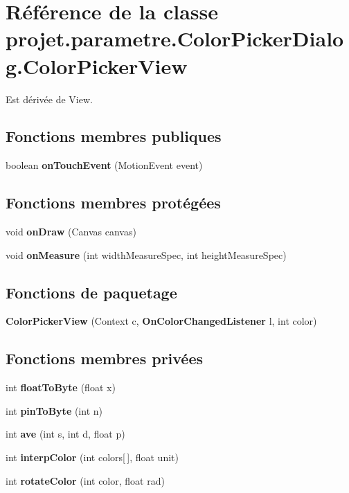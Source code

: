 \section{\-Référence de la classe projet.\-parametre.\-Color\-Picker\-Dialog.\-Color\-Picker\-View}
\label{classprojet_1_1parametre_1_1_color_picker_dialog_1_1_color_picker_view}


\-Est dérivée de \-View.

\subsection*{\-Fonctions membres publiques}
\begin{DoxyCompactItemize}
\item 
boolean {\bf on\-Touch\-Event} (\-Motion\-Event event)
\end{DoxyCompactItemize}
\subsection*{\-Fonctions membres protégées}
\begin{DoxyCompactItemize}
\item 
void {\bf on\-Draw} (\-Canvas canvas)
\item 
void {\bf on\-Measure} (int width\-Measure\-Spec, int height\-Measure\-Spec)
\end{DoxyCompactItemize}
\subsection*{\-Fonctions de paquetage}
\begin{DoxyCompactItemize}
\item 
{\bf \-Color\-Picker\-View} (\-Context c, {\bf \-On\-Color\-Changed\-Listener} l, int color)
\end{DoxyCompactItemize}
\subsection*{\-Fonctions membres privées}
\begin{DoxyCompactItemize}
\item 
int {\bf float\-To\-Byte} (float x)
\item 
int {\bf pin\-To\-Byte} (int n)
\item 
int {\bf ave} (int s, int d, float p)
\item 
int {\bf interp\-Color} (int colors[$\,$], float unit)
\item 
int {\bf rotate\-Color} (int color, float rad)
\end{DoxyCompactItemize}
